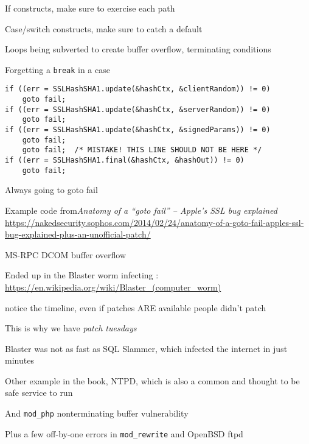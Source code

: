 \documentclass[Screen16to9,17pt]{foils}
\begin{document}


\begin{list2}
\item If constructs, make sure to exercise each path
\item Case/switch constructs, make sure to catch a default
\item Loops being subverted to create buffer overflow, terminating conditions
\item Forgetting a \verb+break+ in a case
\end{list2}



\begin{verbatim}
if ((err = SSLHashSHA1.update(&hashCtx, &clientRandom)) != 0)
    goto fail;
if ((err = SSLHashSHA1.update(&hashCtx, &serverRandom)) != 0)
    goto fail;
if ((err = SSLHashSHA1.update(&hashCtx, &signedParams)) != 0)
    goto fail;
    goto fail;  /* MISTAKE! THIS LINE SHOULD NOT BE HERE */
if ((err = SSLHashSHA1.final(&hashCtx, &hashOut)) != 0)
    goto fail;
\end{verbatim}

\begin{list2}
\item Always going to goto fail
\item Example code from\emph{Anatomy of a “goto fail” – Apple’s SSL bug explained}\\ {\footnotesize\url{https://nakedsecurity.sophos.com/2014/02/24/anatomy-of-a-goto-fail-apples-ssl-bug-explained-plus-an-unofficial-patch/}}

\end{list2}



\begin{list2}
\item MS-RPC DCOM buffer overflow
\item Ended up in the Blaster worm infecting : \url{https://en.wikipedia.org/wiki/Blaster_(computer_worm)}
\item notice the timeline, even if patches ARE available people didn't patch
\item This is why we have \emph{patch tuesdays}
\item Blaster was not as fast as SQL Slammer, which infected the internet in just minutes
\item Other example in the book, NTPD, which is also a common and thought to be safe service to run
\item And \verb+mod_php+ nonterminating buffer vulnerability
\item Plus a few off-by-one errors in \verb+mod_rewrite+ and OpenBSD ftpd
\end{list2}
\end{document}
